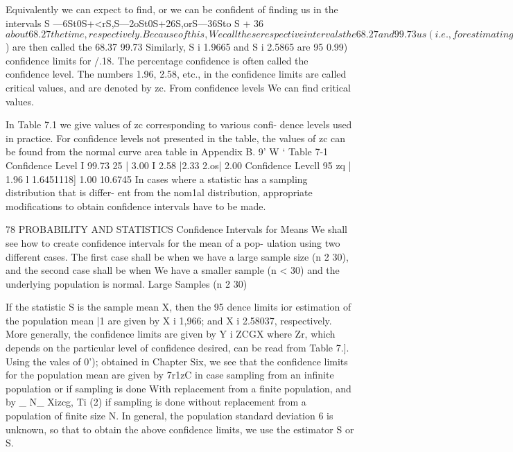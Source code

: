 Equivalently we can expect to ﬁnd, or we
can be conﬁdent of ﬁnding us in the intervals S
—6St0S+<rS,S—2oSt0S+26S,orS—36Sto
S + 36$ about 68.27%
the time, respectively. Because of this, We call
these respective intervals the 68.27%
and 99.73%
us (i.e., for estimating the population parame-
ter, in this case of an unbiased S). The end numbers of these intervals
(S i 0'5, S i 20's, S i 36$) are then called the 68.37%
99.73%
Similarly, S i 1.9665 and S i 2.5865 are 95%
0.99) conﬁdence limits for /.18. The percentage conﬁdence is often called
the conﬁdence level. The numbers 1.96, 2.58, etc., in the conﬁdence
limits are called critical values, and are denoted by zc. From conﬁdence
levels We can ﬁnd critical values.

In Table 7.1 we give values of zc corresponding to various conﬁ-
dence levels used in practice. For conﬁdence levels not presented in the
table, the values of zc can be found from the normal curve area table in
Appendix B.
9'  W
‘
Table 7-1
Conﬁdence Level I 99.73%
25 | 3.00 I 2.58 |2.33 2.os| 2.00
Conﬁdence Levcll 95%
zq | 1.96 l 1.6451118] 1.00 10.6745
In cases where a statistic has a sampling distribution that is differ-
ent from the nom1al distribution, appropriate modiﬁcations to obtain
conﬁdence intervals have to be made.



78 PROBABILITY AND STATISTICS
Confidence Intervals for Means
We shall see how to create conﬁdence intervals for the mean of a pop-
ulation using two different cases. The ﬁrst case shall be when we have a
large sample size (n 2 30), and the second case shall be when We
have a smaller sample (n < 30) and the underlying population is normal.
Large Samples (n 2 30)

If the statistic S is the sample mean X, then the 95%
dence limits ior estimation of the population mean |1 are given by X i
1,966; and X i 2.58037, respectively. More generally, the conﬁdence
limits are given by Y i ZCGX where Zr, which depends on the particular
level of conﬁdence desired, can be read from Table 7.]. Using the vales
of 0'); obtained in Chapter Six, we see that the conﬁdence limits for the
population mean are given by
7r1zC%
in case sampling from an inﬁnite population or if sampling is done With
replacement from a ﬁnite population, and by
_ N_
Xizcg, Ti (2)
if sampling is done without replacement from a population of ﬁnite size N.
In general, the population standard deviation 6 is unknown, so that
to obtain the above conﬁdence limits, we use the estimator S or S.



